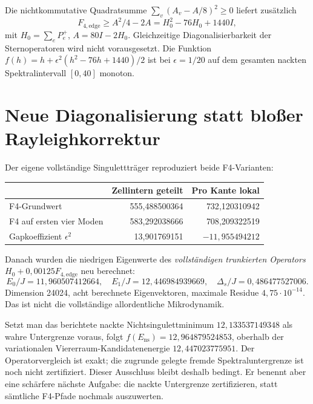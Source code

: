 Die nichtkommutative Quadratsumme $\sum_v(A_v-A/8)^2\ge0$ liefert zusätzlich
\begin{equation}\boxed{
F_{4,\mathrm{edge}}\ge A^2/4-2A=H_0^2-76H_0+1440I,}
\end{equation}
mit $H_0=\sum_eP_e^+$, $A=80I-2H_0$. Gleichzeitige Diagonalisierbarkeit der Sternoperatoren wird nicht vorausgesetzt. Die Funktion $f(h)=h+\epsilon^2(h^2-76h+1440)/2$ ist bei $\epsilon=1/20$ auf dem gesamten nackten Spektralintervall $[0,40]$ monoton.

\section{Neue Diagonalisierung statt bloßer Rayleighkorrektur}
Der eigene vollständige Singulettträger reproduziert beide F4-Varianten:
\begin{center}\begin{tabular}{lrr}
\toprule&Zellintern geteilt&Pro Kante lokal\\\midrule
F4-Grundwert&555{,}488500364&732{,}120310942\\
F4 auf ersten vier Moden&583{,}292038666&708{,}209322519\\
Gapkoeffizient $\epsilon^2$&13{,}901769151&$-11{,}955494212$\\\bottomrule
\end{tabular}\end{center}
Danach wurden die niedrigen Eigenwerte des \emph{vollständigen trunkierten Operators} $H_0+0{,}00125F_{4,\mathrm{edge}}$ neu berechnet:
\begin{equation}
E_0/J=11{,}960507412664,\quad E_1/J=12{,}446984939669,\quad
\Delta_s/J=0{,}486477527006.
\end{equation}
Dimension 24024, acht berechnete Eigenvektoren, maximale Residue $4{,}75\cdot10^{-14}$. Das ist nicht die vollständige allordentliche Mikrodynamik.

Setzt man das berichtete nackte Nichtsingulettminimum $12{,}133537149348$ als wahre Untergrenze voraus, folgt $f(E_{\mathrm{ns}})=12{,}964879524853$, oberhalb der variationalen Viererraum-Kandidatenenergie $12{,}447023775951$. Der Operatorvergleich ist exakt; die zugrunde gelegte fremde Spektraluntergrenze ist noch nicht zertifiziert. Dieser Ausschluss bleibt deshalb bedingt. Er benennt aber eine schärfere nächste Aufgabe: die nackte Untergrenze zertifizieren, statt sämtliche F4-Pfade nochmals auszuwerten.
